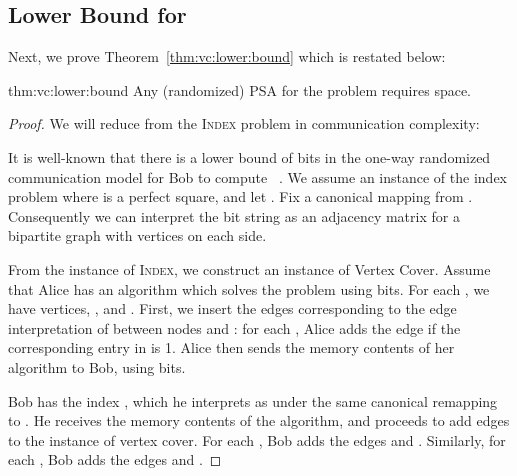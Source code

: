 \documentclass[11pt,letter]{article}
\newcommand{\COMMENTED}[1]{{}}
\newcommand{\junk}[1]{\COMMENTED{#1}}
\begin{document}
\subsection{ Lower Bound for }
\label{sec:vc:bound}

Next, we prove Theorem~\ref{thm:vc:lower:bound} which is restated below:

\begin{reptheorem}{thm:vc:lower:bound}
Any (randomized) PSA for the  problem requires  space.
\label{thm:lower-bound-vc}
\end{reptheorem}
\begin{proof}

We will reduce from the \textsc{Index} problem in communication complexity:

\begin{center}\end{center}

It is well-known that there is a lower bound of  bits
in the one-way randomized communication model for Bob to compute ~\cite{nisan}.
We assume an instance of the index problem where  is a perfect
square, and let . Fix a canonical mapping from .
Consequently we can interpret the bit string as an adjacency matrix for a
bipartite graph with  vertices on each side.

From the instance of \textsc{Index}, we construct an instance 
of Vertex Cover.
Assume that Alice has an algorithm which solves the  problem
using  bits.
For each , we have vertices,
, and .
First, we insert the edges corresponding to the edge interpretation of
 between nodes  and :
  for each , Alice adds the edge  if
  the corresponding entry in  is 1.
Alice then sends the memory contents of her algorithm to Bob, using
 bits.

Bob has the index , which he interprets as  under
the same canonical remapping to .
He receives the memory contents of the algorithm, and proceeds to add
edges to the instance of vertex cover.
For each , Bob adds the edges  and .
Similarly, for each , Bob adds the edges
 and .




\junk{
It follows that there is a lower bound of  bits for Bob
to compute the matrix entry . The next theorem shows that
if there is a single pass streaming algorithm, say ,
which solves the  problem in  space,
then there is a protocol for the \textsc{Matrix Index} instance with  bits.
Hence the lower bound of  transfers to the  problem as well.

}
\end{proof}
\end{document}
